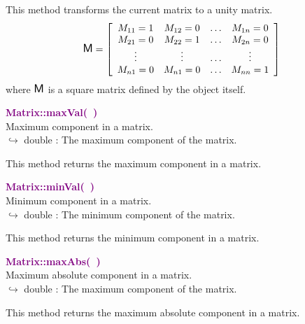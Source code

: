This method transforms the current matrix to a unity matrix.
\begin{equation*}
\mbox{\large\ensuremath{\mathsf{M}}}=\left[\begin{array}{cccc}
  M_{11}=1 & M_{12}=0 & \hdots & M_{1n}=0\\
  M_{21}=0 & M_{22}=1 & \hdots & M_{2n}=0\\
  \vdots & \vdots & \hdots & \vdots\\
  M_{n1}=0 & M_{n1}=0 & \hdots & M_{nn}=1
  \end{array}\right]
\end{equation*}
where $\mbox{\large\ensuremath{\mathsf{M}}}$ is a square matrix defined by the object itself.

\textcolor{purple}{\textbf{Matrix::maxVal(~)}}\label{Matrix::maxVal()}\\
Maximum component in a matrix.\\ \hspace*{10mm}$\hookrightarrow$ double : The maximum component of the matrix.

This method returns the maximum component in a matrix.

\textcolor{purple}{\textbf{Matrix::minVal(~)}}\label{Matrix::minVal()}\\
Minimum component in a matrix.\\ \hspace*{10mm}$\hookrightarrow$ double : The minimum component of the matrix.

This method returns the minimum component in a matrix.

\textcolor{purple}{\textbf{Matrix::maxAbs(~)}}\label{Matrix::maxAbs()}\\
Maximum absolute component in a matrix.\\ \hspace*{10mm}$\hookrightarrow$ double : The maximum component of the matrix.

This method returns the maximum absolute component in a matrix.

